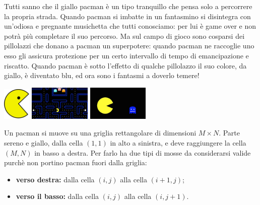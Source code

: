 \renewcommand{\nomebreve}{pacman}
\renewcommand{\titolo}{Percorsi tra pillole e fantasmi}

\introduzione{}

Tutti sanno che il giallo pacman è un tipo tranquillo che pensa solo a percorrere la propria strada. Quando pacman si imbatte in un fantasmino si disintegra con un'odiosa e pregnante musichetta che tutti conosciamo: per lui è game over e non potrà più completare il suo percorso. Ma sul campo di gioco sono cosparsi dei pillolazzi che donano a pacman un superpotere: quando pacman ne raccoglie uno esso gli assicura protezione per un certo intervallo di tempo di emancipazione e riscatto. Quando pacman è sotto l'effetto di qualche pillolazzo il suo colore, da giallo, è diventato blu, ed ora sono i fantasmi a doverlo temere!

\hspace{0.8cm}
\includegraphics[width=0.1\textwidth]{figures/pacman_big.png}
\hfill
\includegraphics[width=0.22\textwidth]{figures/pacman_field.jpeg}
\hfill
\includegraphics[width=0.22\textwidth]{figures/pacman_rage.png}


Un pacman si muove su una griglia rettangolare di dimensioni $M\times N$.
Parte sereno e giallo, dalla cella $(1,1)$ in alto a sinistra, e deve raggiungere la cella $(M,N)$ in basso a destra.
Per farlo ha due tipi di mosse da considerarsi valide purch\`e non portino pacman fuori dalla griglia:
\begin{itemize}
   \item[] {\bf verso destra:} dalla cella $(i,j)$ alla cella $(i+1,j)$;
   \item[] {\bf verso il basso:} dalla cella $(i,j)$ alla cella $(i,j+1)$.
\end{itemize}

